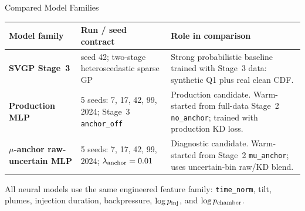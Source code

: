 \documentclass[UTF8,aspectratio=169]{ctexbeamer}
\begin{document}
\begin{frame}{Compared Model Families}
\small
\begin{center}
\renewcommand{\arraystretch}{1.18}
\setlength{\tabcolsep}{4pt}
\begin{tabular}{@{}L{3.8cm}L{4.2cm}L{6.0cm}@{}}
\toprule
\textbf{Model family} & \textbf{Run / seed contract} & \textbf{Role in comparison} \\
\midrule
\textbf{SVGP Stage~3} &
seed 42; two-stage heteroscedastic sparse GP &
Strong probabilistic baseline trained with Stage~3 data: synthetic Q1 plus real clean CDF. \\
\addlinespace
\textbf{Production MLP} &
5 seeds: 7, 17, 42, 99, 2024; Stage~3 \texttt{anchor\_off} &
Production candidate. Warm-started from full-data Stage~2 \texttt{no\_anchor}; trained with production KD loss. \\
\addlinespace
\textbf{\(\mu\)-anchor raw-uncertain MLP} &
5 seeds: 7, 17, 42, 99, 2024; \(\lambda_{\rm anchor}=0.01\) &
Diagnostic candidate. Warm-started from Stage~2 \texttt{mu\_anchor}; uses uncertain-bin raw/KD blend. \\
\bottomrule
\end{tabular}
\end{center}

\vspace{0.45em}
\footnotesize
All neural models use the same engineered feature family:
\texttt{time\_norm}, tilt, plumes, injection duration, backpressure,
\(\log p_{\rm inj}\), and \(\log p_{\rm chamber}\).
\end{frame}
\end{document}
